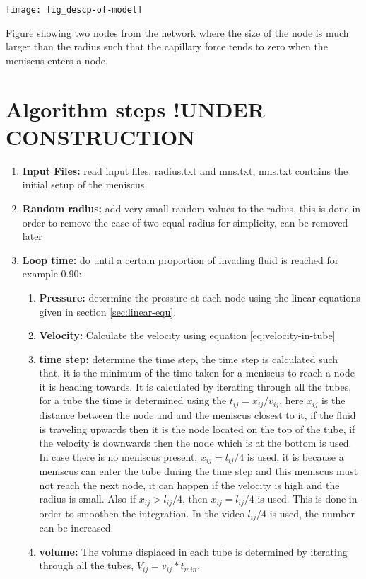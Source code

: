 	\texttt{[image: fig\_descp-of-model]}
	
	Figure showing two nodes from the network where the size of the node is much larger than the radius such that the capillary force tends to zero when the meniscus enters a node. 

\section{Algorithm steps !UNDER CONSTRUCTION}
	\begin{enumerate}
		\item \textbf{Input Files:} read input files, radius.txt and mns.txt, mns.txt contains the initial setup of the meniscus
		\item \textbf{Random radius:} add very small random values to the radius, this is done in order to remove the case of two equal radius for simplicity, can be removed later
		\item \textbf{Loop time:} do until a certain proportion of invading fluid is reached for example 0.90:
		\begin{enumerate}
			\item \textbf{Pressure:} determine the pressure at each node using the linear equations given in section \ref{sec:linear-equ}.
			\item \textbf{Velocity:} Calculate the velocity using equation \ref{eq:velocity-in-tube} 
			\item \textbf{time step:} determine the time step, the time step is calculated such that, it is the minimum of the time taken for a meniscus to reach a node it is heading towards. It is calculated by iterating through all the tubes, for a tube the time is determined using the $t_{ij} = x_{ij} / v_{ij}$, here $x_{ij}$ is the distance between the node and and the meniscus closest to it, if the fluid is traveling upwards then it is the node located on the top of the tube, if the velocity is downwards then the node which is at the bottom is used. In case there is no meniscus present, $x_{ij} = l_{ij} / 4$ is used, it is because a meniscus can enter the tube during the time step and this meniscus must not reach the next node, it can happen if the velocity is high and the radius is small. Also if $x_{ij} > l_{ij} / 4$, then $x_{ij} = l_{ij}/4$ is used. This is done in order to smoothen the integration. In the video $l_{ij}/4$ is used, the number can be increased.
			\item \textbf{volume:} The volume displaced in each tube is determined by iterating through all the tubes, $V_{ij} = v_{ij} * t_{min}$.

\end{enumerate}
\end{enumerate}
